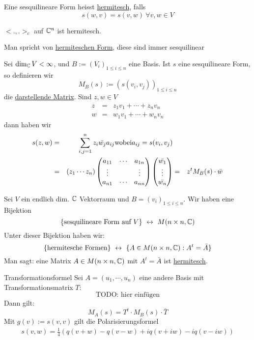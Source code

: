 \begin{Def}
  Eine sesquilineare Form heisst \underline{hermitesch}, falls
  \[s(w,v)=s(v,w)\ \forall v,w\in V\]
\end{Def}
\begin{Bsp}
  $<.,.>_c$ auf $\mathbb{C}^n$ ist hermitesch.
\end{Bsp}
\begin{Bem}
  Man spricht von \underline{hermiteschen Form}, diese sind immer sesquilinear
\end{Bem}
\begin{Def}
  Sei $\dim_{\mathbb{C}} V < \infty$, und $B:=(V_i)_{1\leq i \leq n}$ eine Basis. Ist $s$ eine sesquilineare Form, so definieren wir
  \[M_B(s):=\left( s(v_i,v_j) \right)_{1\leq i \leq n}\]
  die \underline{darstellende Matrix}. Sind $z,w\in V$
  \begin{align*}
    z&=& z_1v_1+\cdots+z_nv_n\\
    w&=& w_1v_1+\cdots+w_nv_n
  \end{align*}
  dann haben wir
  \begin{align*}
    s(z,w)&=&\sum^n_{i,j=1}z_i\bar{w_j}a_{ij} \text{wobei} a_{ij} = s(v_i,v_j)\\
    &=& (z_1\cdots z_n)\begin{pmatrix}a_{11}&\cdots&a_{1n}\\ \vdots & & \vdots \\ a_{n1} & \cdots & a_{nn}\end{pmatrix} \begin{pmatrix}\bar{w_1} \\ \vdots \\ \bar{w_n}\end{pmatrix}
    &=&  z^t M_B(s)\cdot \bar{w}
  \end{align*}
\end{Def}
\begin{Prop}
  Sei $V$ ein endlich dim. $\mathbb{C}$ Vektorraum und $B=(v_i)_{1\leq i \leq n}$. Wir haben eine Bijektion
  \[\{\text{sesquilineare Form auf $V$}\}\ \lra\ M(n\times n, \mb{C})\]
  Unter dieser Bijektion haben wir:
  \[\{\text{hermitesche Formen}\}\ \leftrightarrow\ \{A\in M(n\times n, \mathbb{C}): A^t=\bar{A}\}\]
  Man sagt: eine Matrix $A\in M(n\times n, \mathbb{C})$ mit $A^t=\bar{A}$ ist \underline{hermitesch}.
\end{Prop}
\begin{Sat}{Transformationsformel}
  Sei $A=(u_1,\cdots,u_n)$ eine andere Basis mit Transformationsmatrix $T$:
  \[\text{TODO: hier einfügen}\]
  Dann gilt: 
  \[M_A(s)=T^t\cdot M_B(s)\cdot \bar{T}\]
  Mit $g(v):=s(v,v)$ gilt die Polarisierungsformel
  \begin{align*}
    s(v,w)=\frac{1}{4}\left( q(v+w)-q(v-w)+iq(v+iw)-iq(v-iw) \right)
  \end{align*}
\end{Sat}
